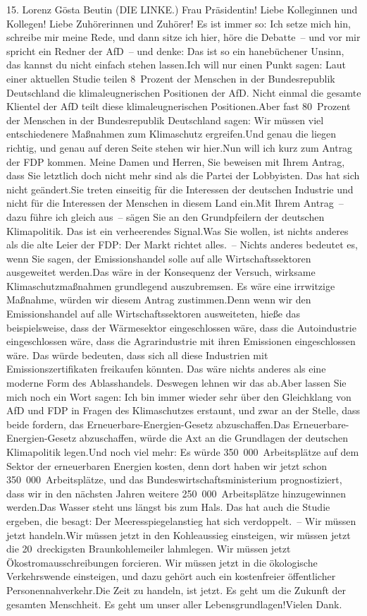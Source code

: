 \documentclass{article}
\begin{document}
	15. Lorenz Gösta Beutin (DIE LINKE.) Frau Präsidentin! Liebe Kolleginnen und Kollegen! Liebe Zuhörerinnen und Zuhörer! Es ist immer so: Ich setze mich hin, schreibe mir meine Rede, und dann sitze ich hier, höre die Debatte – und vor mir spricht ein Redner der AfD – und denke: Das ist so ein hanebüchener Unsinn, das kannst du nicht einfach stehen lassen.Ich will nur einen Punkt sagen: Laut einer aktuellen Studie teilen 8 Prozent der Menschen in der Bundesrepublik Deutschland die klimaleugnerischen Positionen der AfD. Nicht einmal die gesamte Klientel der AfD teilt diese klimaleugnerischen Positionen.Aber fast 80 Prozent der Menschen in der Bundesrepublik Deutschland sagen: Wir müssen viel entschiedenere Maßnahmen zum Klimaschutz ergreifen.Und genau die liegen richtig, und genau auf deren Seite stehen wir hier.Nun will ich kurz zum Antrag der FDP kommen. Meine Damen und Herren, Sie beweisen mit Ihrem Antrag, dass Sie letztlich doch nicht mehr sind als die Partei der Lobbyisten. Das hat sich nicht geändert.Sie treten einseitig für die Interessen der deutschen Industrie und nicht für die Interessen der Menschen in diesem Land ein.Mit Ihrem Antrag – dazu führe ich gleich aus – sägen Sie an den Grundpfeilern der deutschen Klimapolitik. Das ist ein verheerendes Signal.Was Sie wollen, ist nichts anderes als die alte Leier der FDP: Der Markt richtet alles. – Nichts anderes bedeutet es, wenn Sie sagen, der Emissionshandel solle auf alle Wirtschaftssektoren ausgeweitet werden.Das wäre in der Konsequenz der Versuch, wirksame Klimaschutzmaßnahmen grundlegend auszubremsen. Es wäre eine irrwitzige Maßnahme, würden wir diesem Antrag zustimmen.Denn wenn wir den Emissionshandel auf alle Wirtschaftssektoren ausweiteten, hieße das beispielsweise, dass der Wärmesektor eingeschlossen wäre, dass die Autoindustrie eingeschlossen wäre, dass die Agrarindustrie mit ihren Emissionen eingeschlossen wäre. Das würde bedeuten, dass sich all diese Industrien mit Emissionszertifikaten freikaufen könnten. Das wäre nichts anderes als eine moderne Form des Ablasshandels. Deswegen lehnen wir das ab.Aber lassen Sie mich noch ein Wort sagen: Ich bin immer wieder sehr über den Gleichklang von AfD und FDP in Fragen des Klimaschutzes erstaunt, und zwar an der Stelle, dass beide fordern, das Erneuerbare-Energien-Gesetz abzuschaffen.Das Erneuerbare-Energien-Gesetz abzuschaffen, würde die Axt an die Grundlagen der deutschen Klimapolitik legen.Und noch viel mehr: Es würde 350 000 Arbeitsplätze auf dem Sektor der erneuerbaren Energien kosten, denn dort haben wir jetzt schon 350 000 Arbeitsplätze, und das Bundeswirtschaftsministerium prognostiziert, dass wir in den nächsten Jahren weitere 250 000 Arbeitsplätze hinzugewinnen werden.Das Wasser steht uns längst bis zum Hals. Das hat auch die Studie ergeben, die besagt: Der Meeresspiegelanstieg hat sich verdoppelt. – Wir müssen jetzt handeln.Wir müssen jetzt in den Kohleaussieg einsteigen, wir müssen jetzt die 20 dreckigsten Braunkohlemeiler lahmlegen. Wir müssen jetzt Ökostromausschreibungen forcieren. Wir müssen jetzt in die ökologische Verkehrswende einsteigen, und dazu gehört auch ein kostenfreier öffentlicher Personennahverkehr.Die Zeit zu handeln, ist jetzt. Es geht um die Zukunft der gesamten Menschheit. Es geht um unser aller Lebensgrundlagen!Vielen Dank.
\end{document}
